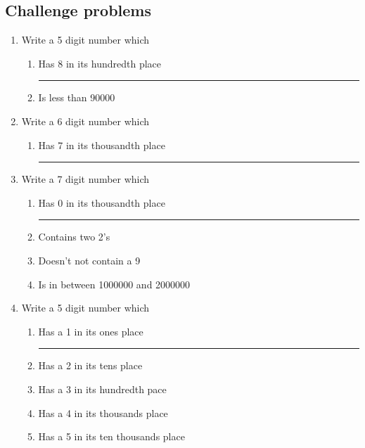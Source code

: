 \documentclass[11pt]{article}
\begin{document}
\subsection{Challenge problems}

\begin{enumerate}
    \item Write a 5 digit number which
    \begin{enumerate}[topsep=0pt, label=\alph*.]
        \item Has 8 in its hundredth place  \rule[-5pt]{5cm}{0.5pt}
        \item Is less than 90000
    \end{enumerate}

    \vspace{1em}

    \item Write a 6 digit number which
    \begin{enumerate}[topsep=0pt, label=\alph*.]
        \item Has 7 in its thousandth place  \rule[-5pt]{5cm}{0.5pt}
    \end{enumerate}

    \vspace{1em}

    \item Write a 7 digit number which
    \begin{enumerate}[topsep=0pt, label=\alph*.]
        \item Has 0 in its thousandth place  \rule[-5pt]{5cm}{0.5pt}
        \item Contains two 2's
        \item Doesn't not contain a 9
        \item Is in between 1000000 and 2000000
    \end{enumerate}

    \vspace{1em}

    \item Write a 5 digit number which
    \begin{enumerate}[topsep=0pt, label=\alph*.]
        \item Has a 1 in its ones place  \rule[-5pt]{5cm}{0.5pt}
        \item Has a 2 in its tens place
        \item Has a 3 in its hundredth pace
        \item Has a 4 in its thousands place
        \item Has a 5 in its ten thousands place
    \end{enumerate}


\end{enumerate}
\end{document}
